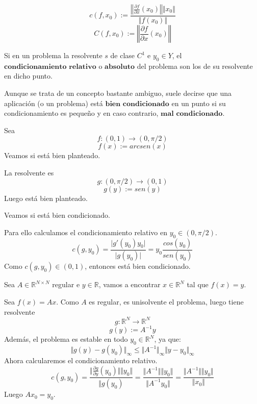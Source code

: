 \[ c(f,x_0) := \frac{\left\Vert \frac{\partial f}{\partial x} (x_0) \right\Vert \Vert x_0 \Vert}{\Vert f(x_0) \Vert} \]
\[ C(f,x_0) := \left\Vert \frac{\partial f}{\partial x} (x_0) \right\Vert \]

\begin{ndef}
Si en un problema la resolvente $s$ de clase $C^1$ e $y_0 \in Y$, el $\textbf{condicionamiento relativo}$ o $\textbf{absoluto}$ del problema son los de su resolvente en dicho punto.
\end{ndef}

\begin{nota}
Aunque se trata de un concepto bastante ambiguo, suele decirse que una aplicación (o un problema) está $\textbf{bien condicionado}$ en un punto si su condicionamiento es pequeño y en caso contrario, $\textbf{mal condicionado}$.
\end{nota}

\begin{ejemplo}
Sea $$f : (0,1) \rightarrow (0, \pi / 2)$$ $$f(x) := arcsen(x)$$
Veamos si está bien planteado.

La resolvente es $$g : (0, \pi / 2) \rightarrow (0,1)$$ $$g(y) := sen(y)$$
Luego está bien planteado.

Veamos si está bien condicionado.

Para ello calculamos el condicionamiento relativo en $y_0 \in (0, \pi / 2)$.
\[ c(g,y_0) = \frac{\vert g'(y_0)y_0 \vert }{\vert g(y_0) \vert} = y_0 \frac{cos(y_0)}{sen(y_0)} \]
Como $c(g,y_0) \in (0,1)$, entonces está bien condicionado.
\end{ejemplo}

\begin{ejemplo}
Sea $A \in \mathbb{R}^{N \times N}$ regular e $y \in \mathbb{R}$, vamos a encontrar $x \in \mathbb{R}^N$ tal que $f(x) = y$.

Sea $f(x) = Ax$. Como $A$ es regular, es unisolvente el problema, luego tiene resolvente $$g : \mathbb{R}^N \rightarrow \mathbb{R}^N$$ $$g(y) := A^{-1}y$$
Además, el problema es estable en todo $y_0 \in \mathbb{R}^N$, ya que:
\[ \Vert g(y) - g(y_0) \Vert _\infty \leq \Vert A^{-1} \Vert _\infty \Vert y - y_0 \Vert _\infty \]
Ahora calcularemos el condicionamiento relativo.
\[ c(g, y_0) = \frac{\Vert \frac{\partial g}{\partial y} (y_0) \Vert \Vert y_0 \Vert }{\Vert g(y_0)} = \frac{\Vert A^{-1} \Vert \Vert y_0 \Vert }{\Vert A^{-1} y_0 \Vert } = \frac{\Vert A^{-1} \Vert \Vert y_0 \Vert }{\Vert x_0 \Vert } \] 
Luego $Ax_0 = y_0$.
\end{ejemplo}

